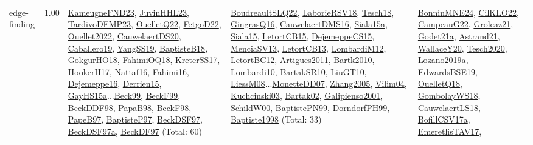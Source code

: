 {\begin{longtable}{p{3cm}r>{\raggedright\arraybackslash}p{6cm}>{\raggedright\arraybackslash}p{6cm}>{\raggedright\arraybackslash}p{8cm}}
\index{edge-finding}\index{Algorithms!edge-finding}edge-finding &  1.00 & \hyperref[detail:KameugneFND23]{KameugneFND23}, \hyperref[detail:JuvinHHL23]{JuvinHHL23}, \hyperref[detail:TardivoDFMP23]{TardivoDFMP23}, \hyperref[detail:OuelletQ22]{OuelletQ22}, \hyperref[detail:FetgoD22]{FetgoD22}, \hyperref[detail:Ouellet2022]{Ouellet2022}, \hyperref[detail:CauwelaertDS20]{CauwelaertDS20}, \hyperref[detail:Caballero19]{Caballero19}, \hyperref[detail:YangSS19]{YangSS19}, \hyperref[detail:BaptisteB18]{BaptisteB18}, \hyperref[detail:GokgurHO18]{GokgurHO18}, \hyperref[detail:FahimiOQ18]{FahimiOQ18}, \hyperref[detail:KreterSS17]{KreterSS17}, \hyperref[detail:HookerH17]{HookerH17}, \hyperref[detail:Nattaf16]{Nattaf16}, \hyperref[detail:Fahimi16]{Fahimi16}, \hyperref[detail:Dejemeppe16]{Dejemeppe16}, \hyperref[detail:Derrien15]{Derrien15}, \hyperref[detail:GayHS15a]{GayHS15a}...\hyperref[detail:Beck99]{Beck99}, \hyperref[detail:BeckF99]{BeckF99}, \hyperref[detail:BeckDDF98]{BeckDDF98}, \hyperref[detail:PapaB98]{PapaB98}, \hyperref[detail:BeckF98]{BeckF98}, \hyperref[detail:PapeB97]{PapeB97}, \hyperref[detail:BaptisteP97]{BaptisteP97}, \hyperref[detail:BeckDSF97]{BeckDSF97}, \hyperref[detail:BeckDSF97a]{BeckDSF97a}, \hyperref[detail:BeckDF97]{BeckDF97} (Total: 60) & \hyperref[detail:BoudreaultSLQ22]{BoudreaultSLQ22}, \hyperref[detail:LaborieRSV18]{LaborieRSV18}, \hyperref[detail:Tesch18]{Tesch18}, \hyperref[detail:GingrasQ16]{GingrasQ16}, \hyperref[detail:CauwelaertDMS16]{CauwelaertDMS16}, \hyperref[detail:Siala15a]{Siala15a}, \hyperref[detail:Siala15]{Siala15}, \hyperref[detail:LetortCB15]{LetortCB15}, \hyperref[detail:DejemeppeCS15]{DejemeppeCS15}, \hyperref[detail:MenciaSV13]{MenciaSV13}, \hyperref[detail:LetortCB13]{LetortCB13}, \hyperref[detail:LombardiM12]{LombardiM12}, \hyperref[detail:LetortBC12]{LetortBC12}, \hyperref[detail:Artigues2011]{Artigues2011}, \hyperref[detail:Bartk2010]{Bartk2010}, \hyperref[detail:Lombardi10]{Lombardi10}, \hyperref[detail:BartakSR10]{BartakSR10}, \hyperref[detail:LiuGT10]{LiuGT10}, \hyperref[detail:LiessM08]{LiessM08}...\hyperref[detail:MonetteDD07]{MonetteDD07}, \hyperref[detail:Zhang2005]{Zhang2005}, \hyperref[detail:Vilim04]{Vilim04}, \hyperref[detail:Kuchcinski03]{Kuchcinski03}, \hyperref[detail:Bartak02]{Bartak02}, \hyperref[detail:Galipienso2001]{Galipienso2001}, \hyperref[detail:SchildW00]{SchildW00}, \hyperref[detail:BaptistePN99]{BaptistePN99}, \hyperref[detail:DorndorfPH99]{DorndorfPH99}, \hyperref[detail:Baptiste1998]{Baptiste1998} (Total: 33) & \hyperref[detail:BonninMNE24]{BonninMNE24}, \hyperref[detail:CilKLO22]{CilKLO22}, \hyperref[detail:CampeauG22]{CampeauG22}, \hyperref[detail:Groleaz21]{Groleaz21}, \hyperref[detail:Godet21a]{Godet21a}, \hyperref[detail:Astrand21]{Astrand21}, \hyperref[detail:WallaceY20]{WallaceY20}, \hyperref[detail:Tesch2020]{Tesch2020}, \hyperref[detail:Lozano2019a]{Lozano2019a}, \hyperref[detail:EdwardsBSE19]{EdwardsBSE19}, \hyperref[detail:OuelletQ18]{OuelletQ18}, \hyperref[detail:GombolayWS18]{GombolayWS18}, \hyperref[detail:CauwelaertLS18]{CauwelaertLS18}, \hyperref[detail:BofillCSV17a]{BofillCSV17a}, \hyperref[detail:EmeretlisTAV17]{EmeretlisTAV17}, 
\end{longtable}}
